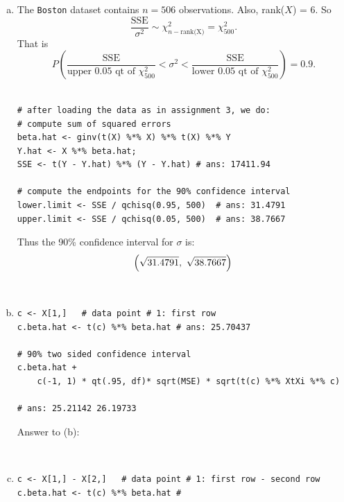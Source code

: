 \documentclass[paper=a4, fontsize=11pt]{scrartcl} %
\begin{document}
\begin{enumerate}[(a)]

\item The \texttt{Boston} dataset contains $n = 506$ observations. Also, rank($X$) = 6. So
$$\frac{\text{SSE}}{ \sigma^2}  \sim \chi^2_{n - \text{rank(X)}} = \chi^2_{500}.$$
That is
$$
P \left(\frac{\text{SSE}}{\text{upper  0.05 } \text{qt of }\chi^2_{500} }  <  \sigma^2 < \frac{\text{SSE}}{\text{lower  0.05 } \text{qt of }\chi^2_{500}}  \right) = 0.9.
$$\\

\begin{lstlisting}[basicstyle=\ttfamily\small\bfseries]
# after loading the data as in assignment 3, we do:
# compute sum of squared errors
beta.hat <- ginv(t(X) %*% X) %*% t(X) %*% Y
Y.hat <- X %*% beta.hat;  
SSE <- t(Y - Y.hat) %*% (Y - Y.hat) # ans: 17411.94

# compute the endpoints for the 90% confidence interval
lower.limit <- SSE / qchisq(0.95, 500)  # ans: 31.4791
upper.limit <- SSE / qchisq(0.05, 500)  # ans: 38.7667
\end{lstlisting}
Thus the 90\% confidence interval for $\sigma$ is:
$$
\left(\sqrt{31.4791},  \ \sqrt{38.7667}\right)  \\
$$
\begin{center}
\\
\end{center}
\pagebreak



\item 

\begin{lstlisting}[basicstyle=\ttfamily\small\bfseries]
c <- X[1,]   # data point # 1: first row
c.beta.hat <- t(c) %*% beta.hat # ans: 25.70437

# 90% two sided confidence interval
c.beta.hat +
    c(-1, 1) * qt(.95, df)* sqrt(MSE) * sqrt(t(c) %*% XtXi %*% c)

# ans: 25.21142 26.19733
\end{lstlisting}

Answer to (b):
\begin{center}
\\
\end{center}
\vspace{5mm}

\item
\begin{lstlisting}[basicstyle=\ttfamily\small\bfseries]
c <- X[1,] - X[2,]   # data point # 1: first row - second row
c.beta.hat <- t(c) %*% beta.hat #


\end{lstlisting}
\end{enumerate}
\end{document}
